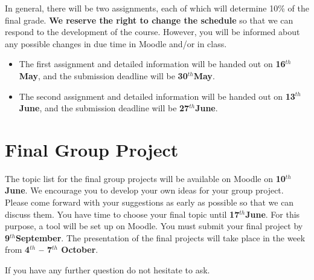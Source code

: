 \documentclass[]{article}
\begin{document}
In general, there will be two assignments, each of which will determine
10\% of the final grade. \textbf{We reserve the right to change the
schedule} so that we can respond to the development of the course.
However, you will be informed about any possible changes in due time in
Moodle and/or in class.

\begin{itemize}
\item
  The first assignment and detailed information will be handed out on
  \textbf{16\(^{th}\)May}, and the submission deadline will be
  \textbf{30\(^{th}\)May}.
\item
  The second assignment and detailed information will be handed out on
  \textbf{13\(^{th}\)June}, and the submission deadline will be
  \textbf{27\(^{th}\)June}.
\end{itemize}

\hypertarget{final-group-project}{%
\section{Final Group Project}\label{final-group-project}}

The topic list for the final group projects will be available on Moodle
on \textbf{10\(^{th}\)June}. We encourage you to develop your own ideas
for your group project. Please come forward with your suggestions as
early as possible so that we can discuss them. You have time to choose
your final topic until \textbf{17\(^{th}\)June}. For this purpose, a
tool will be set up on Moodle. You must submit your final project by
\textbf{9\(^{th}\)September}. The presentation of the final projects
will take place in the week from \textbf{4\(^{th}\) -- 7\(^{th}\)
October}.

If you have any further question do not hesitate to ask.




\newpage
\singlespacing 
\end{document}
